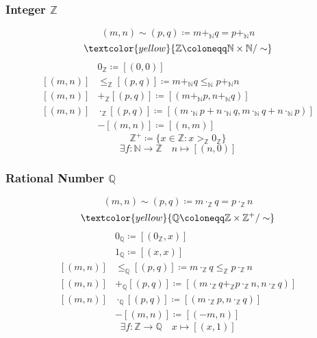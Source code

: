 \documentclass[UTF8,11pt,colorlinks,compress,openany]{beamer}%
\begin{document}
\begin{frame}\frametitle{Integer $\mathbb{Z}$}
	\[(m,n)\sim(p,q)\coloneqq m+_{\mathbb{N}}q=p+_{\mathbb{N}}n\]
	\[\textcolor{yellow}{\mathbb{Z}\coloneqq \mathbb{N}\times\mathbb{N}/\sim}\]
	\begin{align*}
	&0_{\mathbb{Z}}\coloneqq [(0,0)]\\
	[(m,n)]&\leq_{\mathbb{Z}}[(p,q)]\coloneqq m+_{\mathbb{N}}q\leq_{\mathbb{N}}p+_{\mathbb{N}}n\\
	[(m,n)]&+_{\mathbb{Z}}[(p,q)]\coloneqq [(m+_{\mathbb{N}}p,n+_{\mathbb{N}}q)]\\
	[(m,n)]&\cdot_{\mathbb{Z}}[(p,q)]\coloneqq [(m\cdot_{\mathbb{N}}p+n\cdot_{\mathbb{N}}q, m\cdot_{\mathbb{N}}q+n\cdot_{\mathbb{N}}p)]\\
	&-[(m,n)]\coloneqq [(n,m)]
	\end{align*}
	\[\mathbb{Z}^+\coloneqq \{x\in\mathbb{Z}: x>_{\mathbb{Z}}0_{\mathbb{Z}}\}\]
	\[\exists f:\mathbb{N}\to\mathbb{Z}\quad n\mapsto[(n,0)]\]
\end{frame}

\begin{frame}\frametitle{Rational Number $\mathbb{Q}$}
	\[(m,n)\sim(p,q)\coloneqq m\cdot_{\mathbb{Z}}q=p\cdot_{\mathbb{Z}}n\]
	\[\textcolor{yellow}{\mathbb{Q}\coloneqq \mathbb{Z}\times\mathbb{Z}^+/\sim}\]
	\begin{align*}
	&0_{\mathbb{Q}}\coloneqq [(0_{\mathbb{Z}},x)]\\
	&1_{\mathbb{Q}}\coloneqq [(x,x)]\\
	[(m,n)]&\leq_{\mathbb{Q}}[(p,q)]\coloneqq m\cdot_{\mathbb{Z}}q\leq_{\mathbb{Z}}p\cdot_{\mathbb{Z}}n\\
	[(m,n)]&+_{\mathbb{Q}}[(p,q)]\coloneqq [(m\cdot_{\mathbb{Z}}q+_{\mathbb{Z}}p\cdot_{\mathbb{Z}}n,n\cdot_{\mathbb{Z}}q)]\\
	[(m,n)]&\cdot_{\mathbb{Q}}[(p,q)]\coloneqq [(m\cdot_{\mathbb{Z}}p,n\cdot_{\mathbb{Z}}q)]\\
	&-[(m,n)]\coloneqq [(-m,n)]
	\end{align*}
	\[\exists f: \mathbb{Z}\to\mathbb{Q}\quad x\mapsto[(x,1)]\]
\end{frame}
\end{document}
